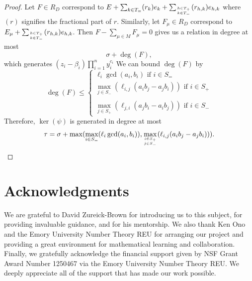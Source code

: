 \documentclass{amsart}
\theoremstyle{plain}
\theoremstyle{definition}
\theoremstyle{remark}
\numberwithin{equation}{section}
\newcommand\bida{a}
\newcommand\bidb{b}
\begin{document}
\begin{proof}
Let $F\in R_D$ correspond to $E + \sum_{k\in T_=} (r_k) e_k + \sum_{h\in T_+ \atop k\in T_-} (r_{h,k}) e_{h,k}$ where $(r)$ signifies the fractional part of $r$.  Similarly, let $F_\mu \in R_D$ correspond to $E_\mu + \sum_{h\in T_+ \atop k\in T_-} (r_{h,k}) e_{h,k}$.  Then $F - \sum_{\mu\in M} F_\mu = 0$ gives us a relation in degree at most
\[
	\sigma + \deg(F),
\]
which generates $(z_i - \beta_i) \prod_{i=1}^n y_i^{c_i}$
We can bound $\deg(F)$ by
\[
	\deg(F) \le \left\{ \begin{split}  \ell_i \gcd(\bida_i, \bidb_i) \mbox{ if } i \in S_= 
			\\ \max_{j\in S_-}(\ell_{i,j} (\bida_i \bidb_
j - \bida_j \bidb_i)) \mbox{ if } i\in S_+ \\
			\\ \max_{j\in S_+}(\ell_{j, i} (\bida_j \bidb_
i - \bida_i \bidb_j)) \mbox{ if } i \in S_- \end{split}  \right.
\]
Therefore, $\ker(\psi)$ is generated in degree at most
\[
	\tau = \sigma
	+ \max( \max_{i\in S_=}(\ell_i \gcd(a_i, b_i)), \max_{i\in S_+ \atop j\in S_-}(\ell_{i,j} (\bida_i \bidb_j - \bida_j \bidb_i))).
\]


\end{proof}



\section{Acknowledgments}
We are grateful to David Zureick-Brown for introducing us to this
subject, for providing invaluable guidance,
and for his mentorship. We also thank Ken Ono and the
Emory University Number Theory REU for arranging our project and
providing a great environment for mathematical learning and
collaboration.
Finally, we gratefully acknowledge the financial support given by
NSF Grant Award Number 1250467 via the Emory University Number
Theory REU. We deeply appreciate all of the support that has made
our work possible.


\nocite{*}
{}

\end{document}

